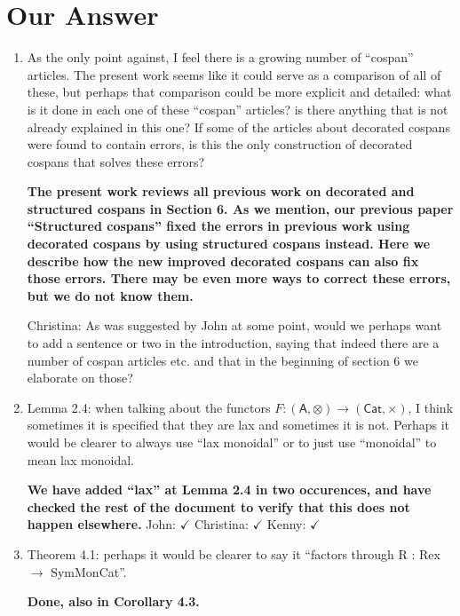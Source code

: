 \documentclass[reqno]{amsart}
\def\chris{\color{purple} Christina: }
\def\john{\color{red} John: }
\def\kenny{\color{blue} Kenny: }
\begin{document}
\section{Our Answer}


\begin{enumerate}

\item As the only point against, I feel there is a growing number of “cospan” articles. The present work seems like it could serve as a comparison of 
all of 
these, but perhaps that comparison could be more explicit and detailed: what is it done in each one of these “cospan” articles? is there anything 
that 
is not already explained in this one? If some of the articles about decorated cospans were found to contain errors, is this the only construction of 
decorated cospans that solves these errors?

{\bf The present work reviews all previous work on decorated and structured cospans in Section 6.  As we mention, our previous paper ``Structured 
cospans'' fixed the errors in previous work using decorated cospans by using structured cospans instead.   Here we describe how the new improved 
decorated cospans can also fix those errors.     There may be even more ways to correct these errors, but we do not know them.}  

{\chris As was suggested by John at some point, would we perhaps want to add a sentence or two in the introduction, saying that indeed there are a 
number of cospan articles etc. and that in the beginning of section 6 we elaborate on those?}

 \item Lemma 2.4: when talking about the functors $F : (\mathsf{A},\otimes)\to(\mathsf{Cat},\times)$, I think sometimes it is specified that they are lax and sometimes 
it is not. Perhaps it would be clearer to always use “lax monoidal” or to just use “monoidal” to mean lax monoidal.

{\bf We have added ``lax'' at Lemma 2.4 in two occurences, and have checked the rest of the document to verify that this does not happen 
elsewhere.}  {\john $\checkmark$} {\chris $\checkmark$} {\kenny $\checkmark$}

\item Theorem 4.1: perhaps it would be clearer to say it “factors through R : Rex $\to$ SymMonCat”.

{\bf Done, also in Corollary 4.3.}  


\end{enumerate}
\end{document}
